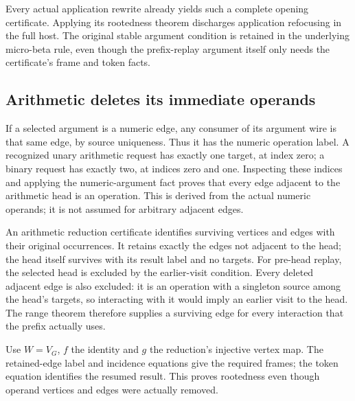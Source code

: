 Every actual application rewrite already yields such a complete opening
certificate. Applying its rootedness theorem discharges application refocusing
in the full host. The original stable argument condition is retained in the
underlying micro-beta rule, even though the prefix-replay argument itself
only needs the certificate's frame and token facts.


\subsection{Arithmetic deletes its immediate operands}

If a selected argument is a numeric edge, any consumer of its argument wire
is that same edge, by source uniqueness. Thus it has the numeric operation
label. A recognized unary arithmetic request has exactly one target, at index
zero; a binary request has exactly two, at indices zero and one. Inspecting
these indices and applying the numeric-argument fact proves that every edge
adjacent to the arithmetic head is an operation. This is derived from the
actual numeric operands; it is not assumed for arbitrary adjacent edges.



An arithmetic reduction certificate identifies surviving vertices and edges
with their original occurrences. It retains exactly the edges not adjacent
to the head; the head itself survives with its result label and no targets.
For pre-head replay, the selected head is excluded by the earlier-visit
condition. Every deleted adjacent edge is also excluded: it is an operation
with a singleton source among the head's targets, so interacting with it would
imply an earlier visit to the head. The range theorem therefore supplies a
surviving edge for every interaction that the prefix actually uses.

Use $W=V_G$, $f$ the identity and $g$ the reduction's injective vertex map.
The retained-edge label and incidence equations give the required frames;
the token equation identifies the resumed result. This proves rootedness
even though operand vertices and edges were actually removed.


